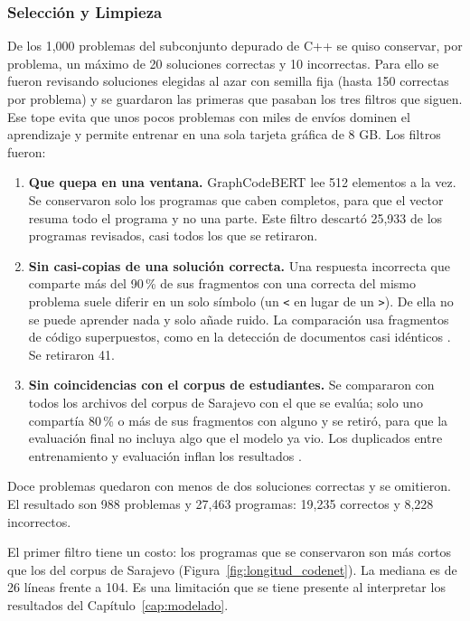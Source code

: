 \subsubsection{Selección y Limpieza}
De los 1,000 problemas del subconjunto depurado de C++ se quiso conservar, por problema, un máximo de 20 soluciones correctas y 10 incorrectas. Para ello se fueron revisando soluciones elegidas al azar con semilla fija (hasta 150 correctas por problema) y se guardaron las primeras que pasaban los tres filtros que siguen. Ese tope evita que unos pocos problemas con miles de envíos dominen el aprendizaje y permite entrenar en una sola tarjeta gráfica de 8 GB. Los filtros fueron:

\begin{enumerate}
    \item \textbf{Que quepa en una ventana.} GraphCodeBERT lee 512 elementos a la vez. Se conservaron solo los programas que caben completos, para que el vector resuma todo el programa y no una parte. Este filtro descartó 25,933 de los programas revisados, casi todos los que se retiraron.
    \item \textbf{Sin casi-copias de una solución correcta.} Una respuesta incorrecta que comparte más del 90\,\% de sus fragmentos con una correcta del mismo problema suele diferir en un solo símbolo (un \texttt{<} en lugar de un \texttt{>}). De ella no se puede aprender nada y solo añade ruido. La comparación usa fragmentos de código superpuestos, como en la detección de documentos casi idénticos \cite{Broder1997Resemblance}. Se retiraron 41.
    \item \textbf{Sin coincidencias con el corpus de estudiantes.} Se compararon con todos los archivos del corpus de Sarajevo con el que se evalúa; solo uno compartía 80\,\% o más de sus fragmentos con alguno y se retiró, para que la evaluación final no incluya algo que el modelo ya vio. Los duplicados entre entrenamiento y evaluación inflan los resultados \cite{Allamanis2019Adverse,Lee2022Dedup}.
\end{enumerate}

Doce problemas quedaron con menos de dos soluciones correctas y se omitieron. El resultado son 988 problemas y 27,463 programas: 19,235 correctos y 8,228 incorrectos.

El primer filtro tiene un costo: los programas que se conservaron son más cortos que los del corpus de Sarajevo (Figura~\ref{fig:longitud_codenet}). La mediana es de 26 líneas frente a 104. Es una limitación que se tiene presente al interpretar los resultados del Capítulo~\ref{cap:modelado}.

